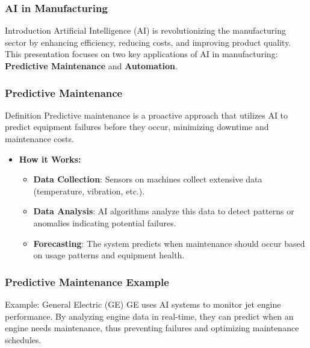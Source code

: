 \documentclass[aspectratio=169]{beamer}
\begin{document}
\begin{frame}[fragile]
    \frametitle{AI in Manufacturing}
    \begin{block}{Introduction}
        Artificial Intelligence (AI) is revolutionizing the manufacturing sector by enhancing efficiency, reducing costs, and improving product quality. This presentation focuses on two key applications of AI in manufacturing: \textbf{Predictive Maintenance} and \textbf{Automation}.
    \end{block}
\end{frame}

\begin{frame}[fragile]
    \frametitle{Predictive Maintenance}
    \begin{block}{Definition}
        Predictive maintenance is a proactive approach that utilizes AI to predict equipment failures before they occur, minimizing downtime and maintenance costs.
    \end{block}

    \begin{itemize}
        \item \textbf{How it Works:}
        \begin{itemize}
            \item \textbf{Data Collection}: Sensors on machines collect extensive data (temperature, vibration, etc.).
            \item \textbf{Data Analysis}: AI algorithms analyze this data to detect patterns or anomalies indicating potential failures.
            \item \textbf{Forecasting}: The system predicts when maintenance should occur based on usage patterns and equipment health.
        \end{itemize}
    \end{itemize}
\end{frame}

\begin{frame}[fragile]
    \frametitle{Predictive Maintenance Example}
    \begin{block}{Example: General Electric (GE)}
        GE uses AI systems to monitor jet engine performance. By analyzing engine data in real-time, they can predict when an engine needs maintenance, thus preventing failures and optimizing maintenance schedules.
    \end{block}
\end{frame}
\end{document}

